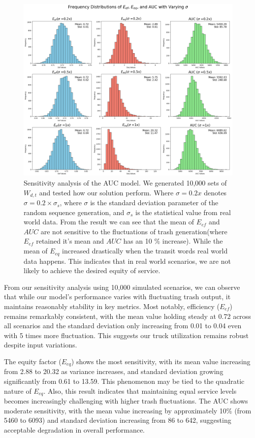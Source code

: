 \documentclass{article}
\begin{document}
\begin{figure}[H]
	\centering
	\includegraphics[width=1\textwidth]{figures/rob.png}
	\caption{Sensitivity analysis of the AUC model. We generated 10,000 sets of $ W_{d,t}$ and tested how our solution perform. Where $ \sigma = 0.2x$ denotes $ \sigma = 0.2 \times \sigma_s$, where $ \sigma$ is the standard deviation parameter of the random sequence generation, and $ \sigma_s$ is the statistical value from real world data. 
	From the result we can see that the mean of $ E_{ef} $ and $ AUC$ are not sensitive to the fluctuations of trash generation(where $ E_{ef}$ retained it's mean and $ AUC$ has an 10 \% increase). While the mean of $ E_{eq}$ increased drastically when the transit words real world data happens. This indicates that in real world scenarios, we are not likely to achieve the desired equity of service.   }
	\label{fig:AUCsen}
\end{figure}

From our sensitivity analysis using 10,000 simulated scenarios, we can observe that while our model's performance varies with fluctuating trash output, it maintains reasonably stability in key metrics. Most notably, efficiency ($E_{ef}$) remains remarkably consistent, with the mean value holding steady at 0.72 across all scenarios and the standard deviation only increasing from 0.01 to 0.04 even with 5 times more fluctuation. This suggests our truck utilization remains robust despite input variations.

The equity factor ($E_{eq}$) shows the most sensitivity, with its mean value increasing from 2.88 to 20.32 as variance increases, and standard deviation growing significantly from 0.61 to 13.59. This phenomenon may be tied to the quadratic nature of $E_{eq}$. Also, this result indicates that maintaining equal service levels becomes increasingly challenging with higher trash fluctuations. The AUC shows moderate sensitivity, with the mean value increasing by approximately 10\% (from 5460 to 6093) and standard deviation increasing from 86 to 642, suggesting acceptable degradation in overall performance.
\end{document}
